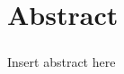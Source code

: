 \documentclass[fontsize=12pt,twoside=semi,openright,numbers=noenddot,parskip=half]{scrbook}
\begin{document}
\chapter{Abstract}
\paragraph{}Insert abstract here
\end{document}
